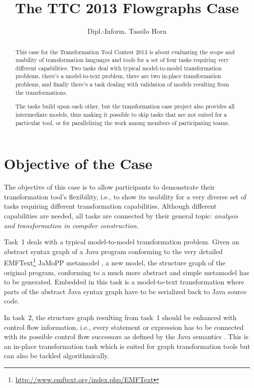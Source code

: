 \documentclass[submission]{eptcs}
\title{The TTC 2013 Flowgraphs Case}
\author{Dipl.-Inform. Tassilo Horn
  \email{\myemail}
  \institute{University Koblenz-Landau, Campus Koblenz\\
    Institute for Software Technology\\
    Universitätsstraße 1, 56070 Koblenz, Germany}}
\begin{document}
\maketitle

\begin{abstract}
  This case for the Transformation Tool Contest 2013 is about evaluating the
  scope and usability of transformation languages and tools for a set of four
  tasks requiring very different capabilities.  Two tasks deal with typical
  model-to-model transformation problems, there's a model-to-text problem,
  there are two in-place transformation problems, and finally there's a task
  dealing with validation of models resulting from the transformations.

  The tasks build upon each other, but the transformation case project also
  provides all intermediate models, thus making it possible to skip tasks that
  are not suited for a particular tool, or for parallelizing the work among
  members of participating teams.
\end{abstract}


\section{Objective of the Case}
\label{sec:objective}

The objective of this case is to allow participants to demonstrate their
transformation tool's flexibility, i.e., to show its usability for a very
diverse set of tasks requiring different transformation capabilities.  Although
different capabilities are needed, all tasks are connected by their general
topic: \emph{analysis and transformation in compiler construction}.

Task~1 deals with a typical model-to-model transformation problem.  Given an
abstract syntax graph of a Java program conforming to the very detailed
EMFText\footnote{\url{http://www.emftext.org/index.php/EMFText}} JaMoPP
metamodel \cite{jamopp09}, a new model, the structure graph of the original
program, conforming to a much more abstract and simple metamodel has to be
generated.  Embedded in this task is a model-to-text transformation where parts
of the abstract Java syntax graph have to be serialized back to Java source
code.

In task~2, the structure graph resulting from task~1 should be enhanced with
control flow information, i.e., every statement or expression has to be
connected with its possible control flow successors as defined by the Java
semantics \cite{Java7Spec}.  This is an in-place transformation task which is
suited for graph transformation tools but can also be tackled algorithmically.
\end{document}
